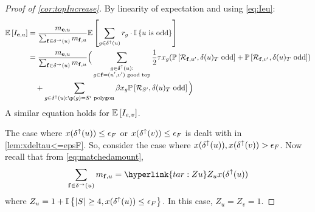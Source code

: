 \begin{proof}[Proof of \cref{cor:topIncrease}]

By linearity of expectation and using \cref{eq:Ieu}:
\begin{align}
\label{eq:Dec-eu}
	\E{I_{\bbe,u}} &= \frac{ m_{\bbe,u}}{ \sum_{\bbf \in \delta^\rightarrow(u)} m_{\bbf,u}} \E{\sum_{g \in \delta^\uparrow(u)} r_g \cdot \I{u \text{ is odd}}}\notag \\
	&= \frac{ m_{\bbe,u}}{ \sum_{\bbf \in \delta^\rightarrow(u)} m_{\bbf,u}} \Big(\sum_{\substack{g\in \delta ^\uparrow (u): \\ g\in \bbf=(u',v') \text{ good top}}  } \frac{1}{2}\tau x_g (\P{\cR_{\bbf,u'},\delta(u)_T\text{ odd}} + \P{\cR_{\bbf,v'},\delta(u)_T\text{ odd}}) \\
	&\quad +\sum_{g\in \delta^\uparrow(u): \p(g)=S'\text { polygon}} \beta x_g \P{\cR_{S'},\delta(u)_T \text{ odd}}\Big)\nonumber 
\end{align} %
A similar equation holds for ${\mathbb{E}}\left[I_{e,v}\right]$.
 
The case where $x(\delta^\uparrow(u))\leq {\epsilon}_F$ or $x(\delta^\uparrow(v))\leq {\epsilon}_F$ is dealt with in \cref{lem:xdeltau<=epsF}. So, consider the case where $x(\delta ^\uparrow(u)), x(\delta ^\uparrow(v)) > {\epsilon}_F$. Now recall that from \eqref{eq:matchedamount}, 
\begin{equation}\label{eq:summeu}
	\sum_{\bbf\in\delta^\rightarrow(u)} m_{\bbf,u} = \hyperlink{tar:Zu}Z_u x(\delta^\uparrow(u))
\end{equation}
 where $Z_u = 1 + {\mathbb{I}}\left\{|S|\geq 4, x(\delta^\uparrow(u))\leq {\epsilon}_F\right\}$. In this case, $Z_u=Z_v=1$. 


\end{proof}
